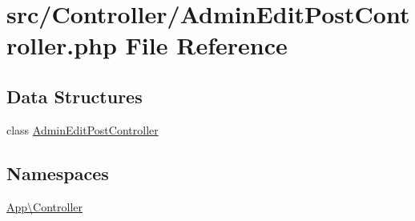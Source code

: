 \hypertarget{_admin_edit_post_controller_8php}{}\section{src/\+Controller/\+Admin\+Edit\+Post\+Controller.php File Reference}
\label{_admin_edit_post_controller_8php}
\subsection*{Data Structures}
\begin{DoxyCompactItemize}
\item 
class \mbox{\hyperlink{class_app_1_1_controller_1_1_admin_edit_post_controller}{Admin\+Edit\+Post\+Controller}}
\end{DoxyCompactItemize}
\subsection*{Namespaces}
\begin{DoxyCompactItemize}
\item 
 \mbox{\hyperlink{namespace_app_1_1_controller}{App\textbackslash{}\+Controller}}
\end{DoxyCompactItemize}
